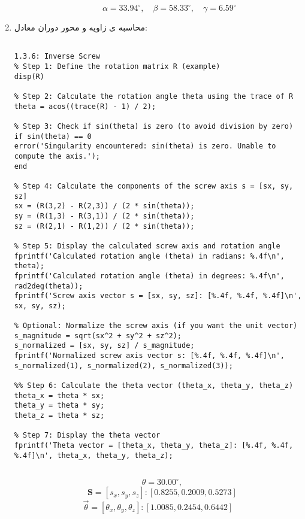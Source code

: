 \begin{enumerate}
\begin{itemize}
\begin{latin}
\begin{lstlisting}[frame=single,style=Matlab-Pyglike]
		
	\end{lstlisting}
\end{latin}

\[
\quad \alpha = 33.94^{\circ},
\quad \beta = 58.33^{\circ},
\quad \gamma = 6.59^{\circ}
\]
\end{itemize}

\item
محاسبه ی زاویه و محور دوران معادل:

\begin{latin}
	\begin{lstlisting}[frame=single,style=Matlab-Pyglike]
		
1.3.6: Inverse Screw 
% Step 1: Define the rotation matrix R (example)
disp(R)

% Step 2: Calculate the rotation angle theta using the trace of R
theta = acos((trace(R) - 1) / 2);

% Step 3: Check if sin(theta) is zero (to avoid division by zero)
if sin(theta) == 0
error('Singularity encountered: sin(theta) is zero. Unable to compute the axis.');
end

% Step 4: Calculate the components of the screw axis s = [sx, sy, sz]
sx = (R(3,2) - R(2,3)) / (2 * sin(theta));
sy = (R(1,3) - R(3,1)) / (2 * sin(theta));
sz = (R(2,1) - R(1,2)) / (2 * sin(theta));

% Step 5: Display the calculated screw axis and rotation angle
fprintf('Calculated rotation angle (theta) in radians: %.4f\n', theta);
fprintf('Calculated rotation angle (theta) in degrees: %.4f\n', rad2deg(theta));
fprintf('Screw axis vector s = [sx, sy, sz]: [%.4f, %.4f, %.4f]\n', sx, sy, sz);

% Optional: Normalize the screw axis (if you want the unit vector)
s_magnitude = sqrt(sx^2 + sy^2 + sz^2);
s_normalized = [sx, sy, sz] / s_magnitude;
fprintf('Normalized screw axis vector s: [%.4f, %.4f, %.4f]\n', s_normalized(1), s_normalized(2), s_normalized(3));

%% Step 6: Calculate the theta vector (theta_x, theta_y, theta_z)
theta_x = theta * sx;
theta_y = theta * sy;
theta_z = theta * sz;

% Step 7: Display the theta vector
fprintf('Theta vector = [theta_x, theta_y, theta_z]: [%.4f, %.4f, %.4f]\n', theta_x, theta_y, theta_z);
		
	\end{lstlisting}
\end{latin}

\[
\quad \theta = 30.00^{\circ},
\]
\[
\quad \textbf{S} = [s_{x}, s_{y}, s_{z}]: [0.8255, 0.2009, 0.5273]
\]
\[
\vec{\theta} = [\theta_{x}, \theta_{y}, \theta_{z}]: [1.0085, 0.2454, 0.6442]
\]


\end{enumerate}
